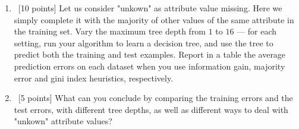 \documentclass[12pt, fullpage,letterpaper]{article}
\begin{document}
\begin{enumerate}
\begin{enumerate}
	\item~[10 points] Let us consider "unkown" as  attribute value missing. Here we simply complete it with the majority of other values of the same attribute in the training set.   Vary the maximum  tree depth from $1$ to $16$ --- for each setting, run your algorithm to learn a decision tree, and use the tree to  predict both the training  and test examples. Report in a table the average prediction errors on each dataset when you use information gain, majority error and gini index heuristics, respectively.
	
	
	\item~[5 points] What can you conclude by comparing the training errors and the test errors, with different tree depths, as well as different ways to deal with "unkown" attribute values?
\end{enumerate}
\end{enumerate}
\end{document}
